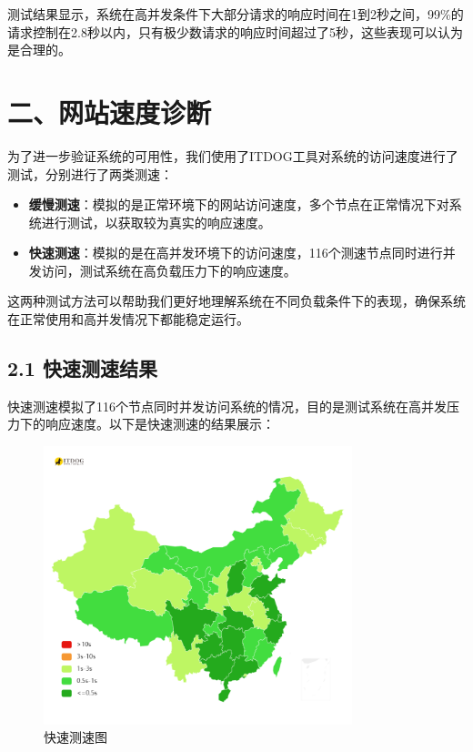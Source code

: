 \documentclass{article}
\begin{document}
测试结果显示，系统在高并发条件下大部分请求的响应时间在1到2秒之间，99\%的请求控制在2.8秒以内，只有极少数请求的响应时间超过了5秒，这些表现可以认为是合理的。

\section*{二、网站速度诊断}

为了进一步验证系统的可用性，我们使用了ITDOG工具对系统的访问速度进行了测试，分别进行了两类测速：
\begin{itemize}
    \item \textbf{缓慢测速}：模拟的是正常环境下的网站访问速度，多个节点在正常情况下对系统进行测试，以获取较为真实的响应速度。
    \item \textbf{快速测速}：模拟的是在高并发环境下的访问速度，116个测速节点同时进行并发访问，测试系统在高负载压力下的响应速度。
\end{itemize}

这两种测试方法可以帮助我们更好地理解系统在不同负载条件下的表现，确保系统在正常使用和高并发情况下都能稳定运行。

\subsection*{2.1 快速测速结果}
快速测速模拟了116个节点同时并发访问系统的情况，目的是测试系统在高并发压力下的响应速度。以下是快速测速的结果展示：

\begin{figure}[H]
    \centering
    \includegraphics[width=0.8\textwidth]{快速测速.png}
    \caption{快速测速图}
\end{figure}
\end{document}
